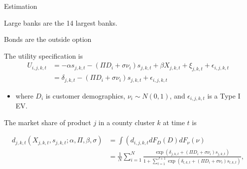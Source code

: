 \documentclass[notes,10pt, aspectratio=169]{beamer}
\newenvironment{wideitemize}{\itemize\addtolength{\itemsep}{10pt}}{\enditemize}
\begin{document}
\begin{frame}{Estimation}

        \vspace{0.3cm}
        \begin{wideitemize}
    
            \item Large banks are the 14 largest banks. 
            
            \item Bonds are the outside option
            \item The utility specification is
            $$
            \begin{aligned}
 U_{i, j, k, t} & =-\alpha s_{j, k, t}-\left(\Pi D_i+\sigma \nu_i\right) s_{j, k, t}+\beta X_{j, k, t}+\xi_{j, k, t}+\epsilon_{i, j, k, t} \\
            & =\delta_{j, k, t}-\left(\Pi D_i+\sigma \nu_i\right) s_{j, k, t}+\epsilon_{i, j, k, t}
            \end{aligned}
            $$

    \begin{itemize}
        \item where $D_i$ is customer demographics, $\nu_i \sim N(0,1)$, and $\epsilon_{i, j, k, t}$ is a Type I EV.
    \end{itemize}
    \item The market share of product $j$ in a county cluster $k$ at time $t$ is

    $$
    \begin{aligned}
 d_{j, k, t}\left(X_{j, k, t}, s_{j, k, t} ; \alpha, \Pi, \beta, \sigma\right) & =\int\left(d_{i, j, k, t} d F_D(D) d F_\nu(\nu)\right. \\
    & =\frac{1}{N} \sum_{i=1}^N \frac{\exp \left(\delta_{j, k, t}+\left(\Pi D_i+\sigma \nu_i\right) s_{j, k, t}\right)}{1+\sum_{l=1}^{J+1} \exp \left(\delta_{l, k, t}+\left(\Pi D_i+\sigma \nu_i\right) s_{l, k, t}\right)},
    \end{aligned}
    $$
    
    \end{wideitemize}

\end{frame}
\end{document}
